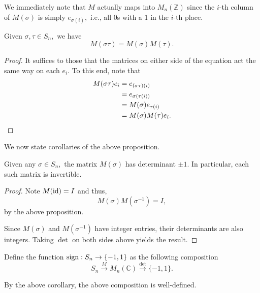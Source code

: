 We immediately note that $M$ actually maps into $M_n(\mathbb{Z})$ since the $i$-th column of $M(\sigma)$ is simply $e_{\sigma(i)},$ i.e., all $0$s with a $1$ in the $i$-th place.

\begin{prop}[$M$ is multiplicative]
	Given $\sigma, \tau \in S_n,$ we have
	\begin{equation*} 
		M(\sigma\tau) = M(\sigma)M(\tau).
	\end{equation*}
\end{prop}
\begin{proof} 
	It suffices to those that the matrices on either side of the equation act the same way on each $e_i.$ To this end, note that
	\begin{align*} 
		M(\sigma\tau)e_i &= e_{(\sigma\tau)(i)}\\
		&= e_{\sigma(\tau(i))}\\
		&= M(\sigma)e_{\tau(i)}\\
		&= M(\sigma)M(\tau)e_i. \qedhere
	\end{align*}
\end{proof}

We now state corollaries of the above proposition.

\begin{cor}
	Given any $\sigma \in S_n,$ the matrix $M(\sigma)$ has determinant $\pm 1.$	In particular, each such matrix is invertible.
\end{cor}
\begin{proof} 
	Note $M(\operatorname{id}) = I$ and thus,
	\begin{equation*} 
		M(\sigma)M(\sigma^{-1}) = I,
	\end{equation*}
	by the above proposition.

	Since $M(\sigma)$ and $M(\sigma^{-1})$ have integer entries, their determinants are also integers. Taking $\det$ on both sides above yields the result.
\end{proof}

\begin{defn} \label{defn:signofperm}
	Define the function $\operatorname{sign}:S_n \to \{-1, 1\}$ as the following composition
	\begin{equation*} 
		S_n \overset{M}{\longrightarrow} M_n(\mathbb{C}) \overset{\det}{\longrightarrow}\{-1, 1\}.
	\end{equation*}
\end{defn}

By the above corollary, the above composition is well-defined.

